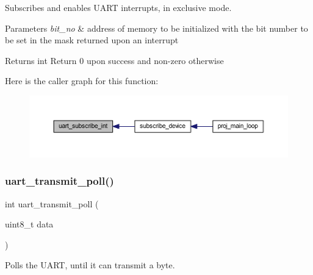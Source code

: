 Subscribes and enables U\+A\+RT interrupts, in exclusive mode. 


\begin{DoxyParams}{Parameters}
{\em bit\+\_\+no} & address of memory to be initialized with the bit number to be set in the mask returned upon an interrupt \\
\hline
\end{DoxyParams}
\begin{DoxyReturn}{Returns}
int Return 0 upon success and non-\/zero otherwise 
\end{DoxyReturn}
Here is the caller graph for this function\+:\nopagebreak
\begin{figure}[H]
\begin{center}
\leavevmode
\includegraphics[width=350pt]{group__uart_gac0d5ac077c28fa582ed60b1c3d977d83_icgraph}
\end{center}
\end{figure}
\mbox{\label{group__uart_ga7c1b3c604c178875b108adfbd853f81f}} 
\subsubsection{\texorpdfstring{uart\+\_\+transmit\+\_\+poll()}{uart\_transmit\_poll()}}
{\footnotesize\ttfamily int uart\+\_\+transmit\+\_\+poll (\begin{DoxyParamCaption}\item[{uint8\+\_\+t}]{data }\end{DoxyParamCaption})}



Polls the U\+A\+RT, until it can transmit a byte. 



